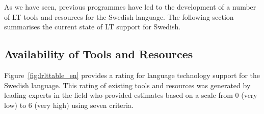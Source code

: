 \begin{multicols}{2}
As we have seen, previous programmes have led to the development of a number of LT tools and resources for the Swedish language. The following section summarises the current state of LT support for Swedish.
  
\subsection{Availability of Tools and Resources}
\label{section:LTavailability_en}

Figure~\ref{fig:lrlttable_en} provides a rating for language technology support for the Swedish language. This rating of existing tools and resources was generated by leading experts in the field who provided estimates based on a scale from 0 (very low) to 6 (very high) using seven criteria.


\end{multicols}
